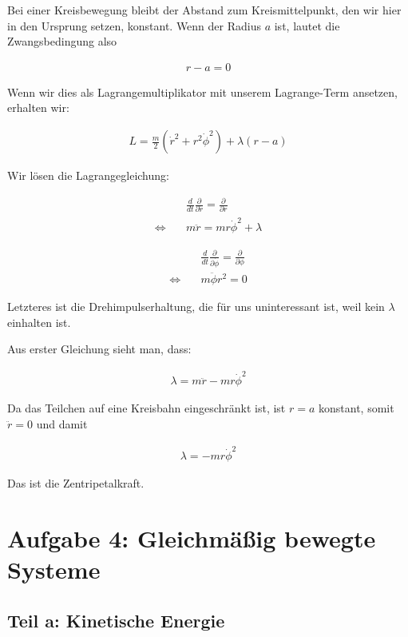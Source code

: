 \documentclass[a4paper,german,12pt,smallheadings]{scrartcl}
\begin{document}
Bei einer Kreisbewegung bleibt der Abstand zum Kreismittelpunkt, den wir hier
in den Ursprung setzen, konstant. Wenn der Radius $a$ ist, lautet die
Zwangsbedingung also

\begin{align*}
  r - a = 0
\end{align*}

Wenn wir dies als Lagrangemultiplikator mit unserem Lagrange-Term ansetzen, erhalten wir:

\begin{align*}
  L = \frac{m}{2} (\dot{r}^2 + r^2\dot{\phi}^2)  + \lambda(r-a)
\end{align*}

Wir lösen die Lagrangegleichung:

\begin{align*}
  &\frac{d}{dt} \frac{\partial}{\partial \dot{r}} = \frac{\partial}{\partial r} \\
  \Leftrightarrow\quad& m\ddot{r} = mr\dot{\phi}^2 + \lambda
\end{align*}

\begin{align*}
  &\frac{d}{dt} \frac{\partial}{\partial \dot{\phi}} = \frac{\partial}{\partial \phi} \\
  \Leftrightarrow\quad& m\ddot{\phi}r^2 = 0
\end{align*}

Letzteres ist die Drehimpulserhaltung, die für uns uninteressant ist, weil kein
$\lambda$ einhalten ist.

Aus erster Gleichung sieht man, dass:

\begin{align*}
  \lambda = m\ddot{r} - mr\dot{\phi}^2
\end{align*}

Da das Teilchen auf eine Kreisbahn eingeschränkt ist, ist $r=a$ konstant, somit $\ddot{r} = 0$ und damit

\begin{align*}
  \lambda = -mr\dot{\phi}^2
\end{align*}

Das ist die Zentripetalkraft.

\section{Aufgabe 4: Gleichmäßig bewegte Systeme}
\subsection*{Teil a: Kinetische Energie}
\end{document}
